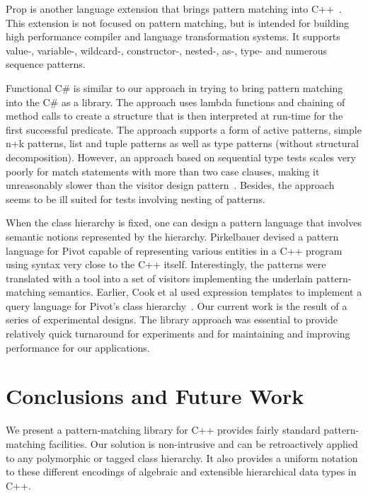 \documentclass{llncs}
\begin{document}
Prop is another language extension that brings pattern matching into 
C++~\cite{Prop96}. This extension is not focused on pattern 
matching, but is intended for building high performance 
compiler and language transformation systems. It supports value-, variable-, 
wildcard-, constructor-, nested-, as-, type- and numerous sequence patterns.

Functional C\# is similar to our approach in trying to bring pattern matching 
into the C\# as a library\cite{FuncCSharp}. The approach uses lambda functions 
and chaining of method calls to create a structure that is then interpreted at 
run-time for the first successful predicate. The approach supports a form of 
active patterns, simple n+k patterns, list and tuple patterns as well as type 
patterns (without structural decomposition). 
However, an approach based on sequential type tests 
scales very poorly for match statements with more than two case clauses, making 
it unreasonably slower than the visitor design pattern~\cite{TypeSwitch}. Besides, the approach 
seems to be ill suited for tests involving nesting of patterns.

When the class hierarchy is fixed, one can design a pattern language that involves 
semantic notions represented by the hierarchy. Pirkelbauer devised a pattern 
language for Pivot capable of representing various entities in a C++ program using syntax very close to the C++ itself. 
Interestingly, the patterns were translated with a tool into a set of visitors 
implementing the underlain pattern-matching semantics\cite{PirkelbauerThesis}. 
Earlier, Cook et al used expression templates to implement a query language for 
Pivot's class hierarchy~\cite{iql04}. Our current work is the result of a series 
of experimental designs. The library approach was essential to provide 
relatively quick turnaround for experiments and for maintaining and improving 
performance for our applications.

\section{Conclusions and Future Work} %
\label{sec:cc}

We present a pattern-matching library for C++ provides fairly standard
pattern-matching facilities. Our solution is 
non-intrusive and can be retroactively applied to any polymorphic or tagged 
class hierarchy. It also provides a uniform notation to these different 
encodings of algebraic and extensible hierarchical data types in C++.
\end{document}
